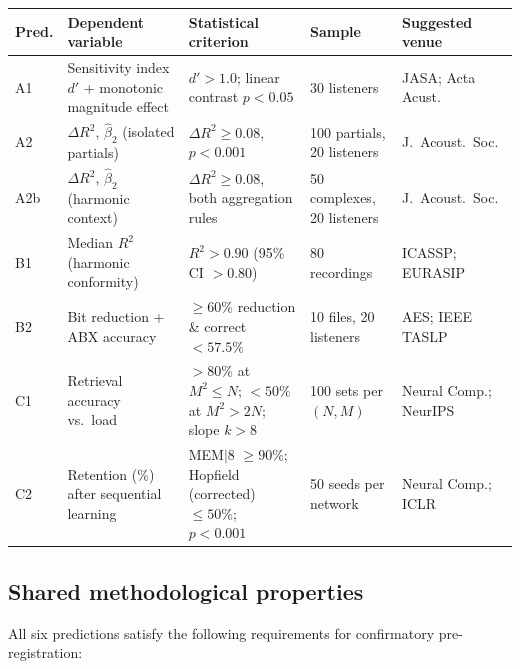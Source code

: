 \documentclass[11pt, a4paper]{article}
\newcommand{\mem}{MEM$|$8}
\begin{document}
\noindent\begin{minipage}{\textwidth}
\centering
\renewcommand{\arraystretch}{1.5}
\begin{tabular}{p{1.1cm} p{3.5cm} p{3.5cm} p{2.0cm} p{2.2cm}}
\toprule
\textbf{Pred.} & \textbf{Dependent variable} & \textbf{Statistical criterion}
  & \textbf{Sample} & \textbf{Suggested venue} \\
\midrule
A1 & Sensitivity index $d'$ + monotonic magnitude effect &
  $d' > 1.0$; linear contrast $p < 0.05$ &
  30 listeners &
  JASA; Acta Acust. \\
A2 & $\Delta R^2$, $\hat{\beta}_2$ (isolated partials) &
  $\Delta R^2 \geq 0.08$, $p < 0.001$ &
  100 partials, 20 listeners &
  J.\ Acoust.\ Soc. \\
A2b & $\Delta R^2$, $\hat{\beta}_2$ (harmonic context) &
  $\Delta R^2 \geq 0.08$, both aggregation rules &
  50 complexes, 20 listeners &
  J.\ Acoust.\ Soc. \\
B1 & Median $R^2$ (harmonic conformity) &
  $R^2 > 0.90$ (95\% CI $> 0.80$) &
  80 recordings &
  ICASSP; EURASIP \\
B2 & Bit reduction + ABX accuracy &
  $\geq 60\%$ reduction \& correct $< 57.5\%$ &
  10 files, 20 listeners &
  AES; IEEE TASLP \\
C1 & Retrieval accuracy vs.\ load &
  $> 80\%$ at $M^2 \leq N$; $< 50\%$ at $M^2 > 2N$; slope $k > 8$ &
  100 sets per $(N,M)$ &
  Neural Comp.; NeurIPS \\
C2 & Retention (\%) after sequential learning &
  \mem{} $\geq 90\%$; Hopfield (corrected) $\leq 50\%$; $p < 0.001$ &
  50 seeds per network &
  Neural Comp.; ICLR \\
\bottomrule
\end{tabular}
\end{minipage}

\subsection*{Shared methodological properties}

All six predictions satisfy the following requirements for confirmatory
pre-registration:
\end{document}
